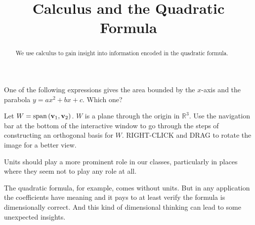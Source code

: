 \documentclass{ximera}
\title{Calculus and the Quadratic Formula}
\begin{document}
\begin{abstract}
We use calculus to gain insight into information encoded in the quadratic formula.
\end{abstract}
\maketitle

\begin{exercise}  
  One of the following expressions gives the area bounded by the $x$-axis and the parabola $y=ax^2+bx+c$. Which one?  
  \begin{multipleChoice}  
  \end{multipleChoice}  
\end{exercise}  

\begin{exploration}\label{exp:orth2}
Let $W =\mbox{span}\left({\bf v}_1,{\bf v}_2\right)$. $W$ is a plane through the origin in $\mathbb{R}^3$.  Use the navigation bar at the bottom of the interactive window to go through the steps of constructing an orthogonal basis for $W$.  RIGHT-CLICK and DRAG to rotate the image for a better view.
 
 
\begin{onlineOnly}
    \begin{center}
\end{center}
\end{onlineOnly}
\end{exploration}



Units should play a more prominent role in our classes, particularly in places where they seem not to play any role at all.

The quadratic formula, for example, comes without units. But in any application the coefficients have meaning and it pays to at least verify the formula is dimensionally correct. And this kind of dimensional thinking can lead to some unexpected insights. %
\end{document}
